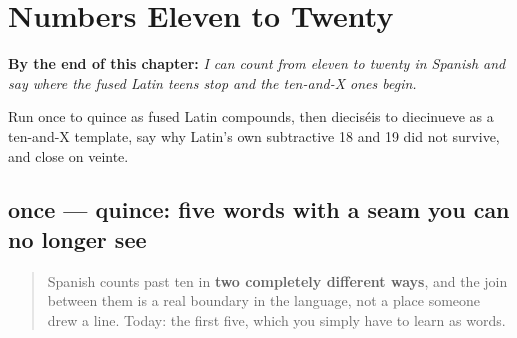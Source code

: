 
\chapter{Numbers Eleven to Twenty}
\label{ch:spanish-numbers-eleven-to-twenty}

\begin{chapteropening}
\textbf{By the end of this chapter:} \emph{I can count from eleven to twenty in Spanish and say where the fused Latin teens stop and the ten-and-X ones begin.}

Run once to quince as fused Latin compounds, then dieciséis to diecinueve as a ten-and-X template, say why Latin's own subtractive 18 and 19 did not survive, and close on veinte.
\end{chapteropening}

\section[once — quince]{once — quince: five words with a seam you can no longer see}

\label{lesson:ES-C31-once-quince}



\begin{quote}
Spanish counts past ten in \textbf{two completely different ways}, and the join between them is a real boundary in the language, not a place someone drew a line. Today: the first five, which you simply have to learn as words.
\end{quote}

